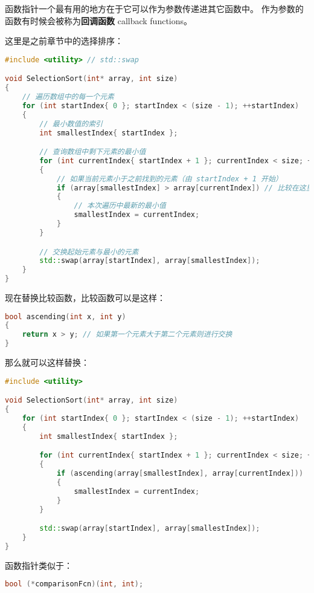 \documentclass[../../LearnCpp.tex]{subfiles}
\begin{document}
函数指针一个最有用的地方在于它可以作为参数传递进其它函数中。
作为参数的函数有时候会被称为\textbf{回调函数} callback functions。

这里是之前章节中的选择排序：

\begin{lstlisting}[language=C++]
#include <utility> // std::swap

void SelectionSort(int* array, int size)
{
    // 遍历数组中的每一个元素
    for (int startIndex{ 0 }; startIndex < (size - 1); ++startIndex)
    {
        // 最小数值的索引
        int smallestIndex{ startIndex };

        // 查询数组中剩下元素的最小值
        for (int currentIndex{ startIndex + 1 }; currentIndex < size; ++currentIndex)
        {
            // 如果当前元素小于之前找到的元素（由 startIndex + 1 开始）
            if (array[smallestIndex] > array[currentIndex]) // 比较在这里完成
            {
                // 本次遍历中最新的最小值
                smallestIndex = currentIndex;
            }
        }

        // 交换起始元素与最小的元素
        std::swap(array[startIndex], array[smallestIndex]);
    }
}
\end{lstlisting}

现在替换比较函数，比较函数可以是这样：

\begin{lstlisting}[language=C++]
bool ascending(int x, int y)
{
    return x > y; // 如果第一个元素大于第二个元素则进行交换
}
\end{lstlisting}

那么就可以这样替换：

\begin{lstlisting}[language=C++]
#include <utility>

void SelectionSort(int* array, int size)
{
    for (int startIndex{ 0 }; startIndex < (size - 1); ++startIndex)
    {
        int smallestIndex{ startIndex };

        for (int currentIndex{ startIndex + 1 }; currentIndex < size; ++currentIndex)
        {
            if (ascending(array[smallestIndex], array[currentIndex]))
            {
                smallestIndex = currentIndex;
            }
        }

        std::swap(array[startIndex], array[smallestIndex]);
    }
}
\end{lstlisting}

函数指针类似于：

\begin{lstlisting}[language=C++]
bool (*comparisonFcn)(int, int);
\end{lstlisting}
\end{document}
